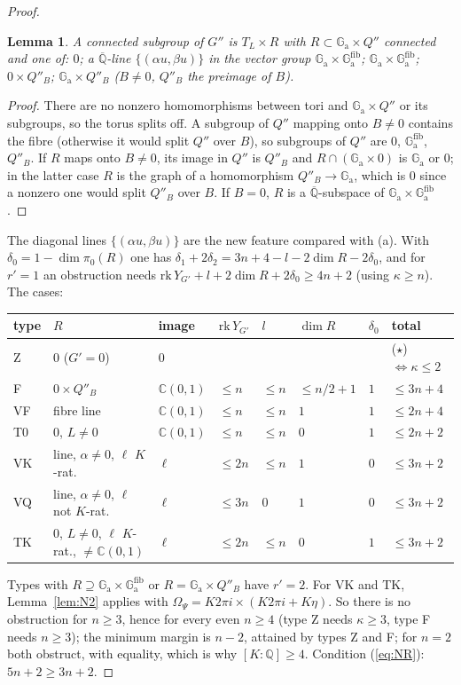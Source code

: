 \documentclass[11pt]{amsart}
\newtheorem{lemma}[theorem]{Lemma}
\theoremstyle{definition}
\newcommand{\Qb}{\overline{\mathbb{Q}}}
\newcommand{\C}{\mathbb{C}}
\newcommand{\Q}{\mathbb{Q}}
\newcommand{\Ga}{\mathbb{G}_{\mathrm a}}
\begin{document}
\begin{proof}
\begin{lemma}\label{lem:SMGnsub}
A connected subgroup of $G''$ is $T_L\times R$ with $R\subset\Ga\times Q''$ connected and one of: $0$; a $\Qb$-line
$\{(\alpha u,\beta u)\}$ in the vector group $\Ga\times\Ga^{\mathrm{fib}}$; $\Ga\times\Ga^{\mathrm{fib}}$; $0\times Q''_B$;
$\Ga\times Q''_B$ ($B\ne0$, $Q''_B$ the preimage of $B$).
\end{lemma}

\begin{proof}
There are no nonzero homomorphisms between tori and $\Ga\times Q''$ or its subgroups, so the torus splits off. A subgroup
of $Q''$ mapping onto $B\ne0$ contains the fibre (otherwise it would split $Q''$ over $B$), so subgroups of $Q''$ are
$0$, $\Ga^{\mathrm{fib}}$, $Q''_B$. If $R$ maps onto $B\neq0$, its image in $Q''$ is $Q''_B$ and $R\cap(\Ga\times0)$ is
$\Ga$ or $0$; in the latter case $R$ is the graph of a homomorphism $Q''_B\to\Ga$, which is $0$ since a nonzero one would
split $Q''_B$ over $B$. If $B=0$, $R$ is a $\Qb$-subspace of $\Ga\times\Ga^{\mathrm{fib}}$.
\end{proof}

\noindent The diagonal lines $\{(\alpha u,\beta u)\}$ are the new feature compared with (a). With
$\delta_0=1-\dim\pi_0(R)$ one has $\delta_1+2\delta_2=3n+4-l-2\dim R-2\delta_0$, and for $r'=1$ an obstruction needs
$\mathrm{rk}\,Y_{G'}+l+2\dim R+2\delta_0\ge4n+2$ (using $\kappa\ge n$). The cases:
\begin{center}
\begin{tabular}{llllllll}
type & $R$ & image & $\mathrm{rk}\,Y_{G'}$ & $l$ & $\dim R$ & $\delta_0$ & total\\\hline
Z & $0$ ($G'=0$) & $0$ & & & & & ($\star$) $\iff\kappa\le2$\\
F & $0\times Q''_B$ & $\C(0,1)$ & $\le n$ & $\le n$ & $\le n/2+1$ & $1$ & $\le3n+4$\\
VF & fibre line & $\C(0,1)$ & $\le n$ & $\le n$ & $1$ & $1$ & $\le2n+4$\\
T0 & $0$, $L\ne0$ & $\C(0,1)$ & $\le n$ & $\le n$ & $0$ & $1$ & $\le2n+2$\\
VK & line, $\alpha\ne0$, $\ell$ $K$-rat. & $\ell$ & $\le2n$ & $\le n$ & $1$ & $0$ & $\le3n+2$\\
VQ & line, $\alpha\ne0$, $\ell$ not $K$-rat. & $\ell$ & $\le3n$ & $0$ & $1$ & $0$ & $\le3n+2$\\
TK & $0$, $L\ne0$, $\ell$ $K$-rat., $\ne\C(0,1)$ & $\ell$ & $\le2n$ & $\le n$ & $0$ & $1$ & $\le3n+2$
\end{tabular}
\end{center}
Types with $R\supseteq\Ga\times\Ga^{\mathrm{fib}}$ or $R=\Ga\times Q''_B$ have $r'=2$. For VK and TK, Lemma~\ref{lem:N2}
applies with $\Omega_\Psi=K2\pi i\times(K2\pi i+K\eta)$. So there is no obstruction for $n\ge3$, hence for every even
$n\ge4$ (type Z needs $\kappa\ge3$, type F needs $n\ge3$); the minimum margin is $n-2$, attained by types Z and F; for $n=2$
both obstruct, with equality, which is why $[K:\Q]\ge4$.
Condition (\ref{eq:NR}): $5n+2\ge3n+2$.
\end{proof}
\end{document}
